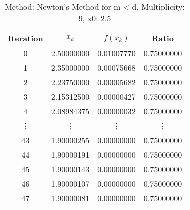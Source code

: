 \begin{table}
\centering
\caption{Method: Newton's Method for m < d, Multiplicity: 9, x0: 2.5}
\label{tab:table_Newton's_Method_for_m_<_d_9_2_5}
\begin{tabular}{c c c c}
\toprule
Iteration &      $x_k$ &   $f(x_k)$ &      Ratio \\
\midrule
        0 & 2.50000000 & 0.01007770 & 0.75000000 \\
        1 & 2.35000000 & 0.00075668 & 0.75000000 \\
        2 & 2.23750000 & 0.00005682 & 0.75000000 \\
        3 & 2.15312500 & 0.00000427 & 0.75000000 \\
        4 & 2.08984375 & 0.00000032 & 0.75000000 \\
   \vdots &     \vdots &     \vdots &     \vdots \\
       43 & 1.90000255 & 0.00000000 & 0.75000000 \\
       44 & 1.90000191 & 0.00000000 & 0.75000000 \\
       45 & 1.90000143 & 0.00000000 & 0.75000000 \\
       46 & 1.90000107 & 0.00000000 & 0.75000000 \\
       47 & 1.90000081 & 0.00000000 & 0.75000000 \\
\bottomrule
\end{tabular}
\end{table}
